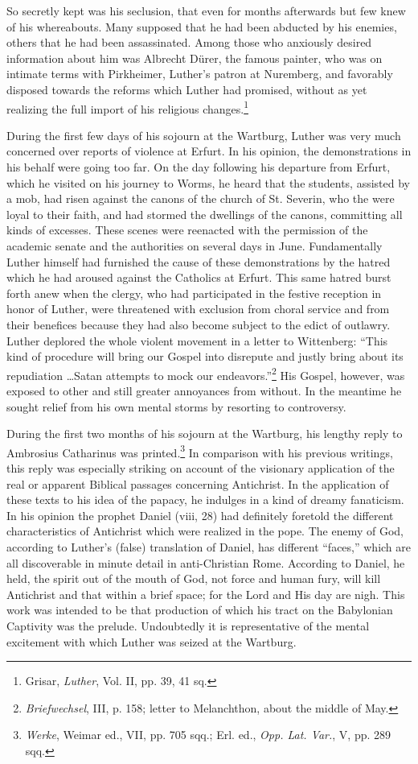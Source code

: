 So secretly kept was his seclusion, that even for months afterwards
but few knew of his whereabouts. Many supposed that he had been
abducted by his enemies, others that he had been assassinated. Among
those who anxiously desired information about him was Albrecht
Dürer, the famous painter, who was on intimate terms with Pirkheimer,
Luther’s patron at Nuremberg, and favorably disposed
towards the reforms which Luther had promised, without as yet
realizing the full import of his religious changes.\footnote{Grisar, \textit{Luther}, Vol. II, pp. 39, 41 sq.}

During the first few days of his sojourn at the Wartburg, Luther
was very much concerned over reports of violence at Erfurt. In
his opinion, the demonstrations in his behalf were going too far. On
the day following his departure from Erfurt, which he visited on
his journey to Worms, he heard that the students, assisted by a mob,
had risen against the canons of the church of St. Severin, who
the were loyal to their faith, and had stormed the dwellings of the
canons, committing all kinds of excesses. These scenes were reenacted
with the permission of the academic senate and the authorities on
several days in June. Fundamentally Luther himself had furnished
the cause of these demonstrations by the hatred which he had
aroused against the Catholics at Erfurt. This same hatred burst
forth anew when the clergy, who had participated in the festive
reception in honor of Luther, were threatened with exclusion from
choral service and from their benefices because they had also become
subject to the edict of outlawry. Luther deplored the whole violent
movement in a letter to Wittenberg: “This kind of procedure will
bring our Gospel into disrepute and justly bring about its repudiation \dots Satan
attempts to mock our endeavors.”\footnote
{\textit{Briefwechsel}, III, p. 158; letter to Melanchthon, about the middle of May.}
His Gospel,
however, was exposed to other and still greater annoyances from
without. In the meantime he sought relief from his own mental
storms by resorting to controversy.

During the first two months of his sojourn at the Wartburg, his
lengthy reply to Ambrosius Catharinus was printed.\footnote{\textit{Werke}, Weimar ed., VII, pp. 705 sqq.; Erl. ed., \textit{Opp. Lat. Var.}, V, pp. 289 sqq.}
In comparison
with his previous writings, this reply was especially striking on account
of the visionary application of the real or apparent Biblical
passages concerning Antichrist. In the application of these texts
to his idea of the papacy, he indulges in a kind of dreamy fanaticism.
In his opinion the prophet Daniel (viii, 28) had definitely foretold
the different characteristics of Antichrist which were realized in
the pope. The enemy of God, according to Luther’s (false) translation of
Daniel, has different “faces,” which are all discoverable in
minute detail in anti-Christian Rome. According to Daniel, he held,
the spirit out of the mouth of God, not force and human fury, will
kill Antichrist and that within a brief space; for the Lord and
His day are nigh. This work was intended to be that production of
which his tract on the Babylonian Captivity was the prelude. Undoubtedly
it is representative of the mental excitement with which
Luther was seized at the Wartburg.

